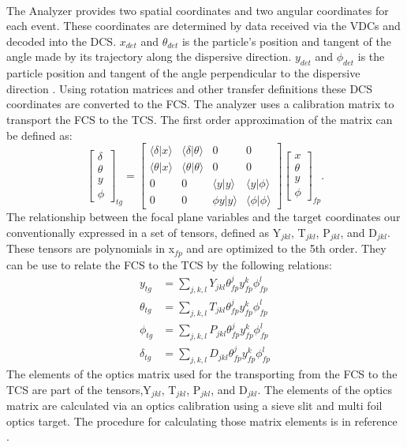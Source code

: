 \paragraph{} The Analyzer provides two spatial coordinates and two angular coordinates for each event. These coordinates are determined by data received via the VDCs and decoded into the DCS. $x_{det}$ and $\theta_{det}$ is the particle's position and tangent of the angle made by its trajectory along the dispersive direction. $y_{det}$ and $\phi_{det}$ is the particle position and tangent of the angle perpendicular to the dispersive direction \cite{optics}. Using rotation matrices and other transfer definitions these DCS coordinates are converted to the FCS. The analyzer uses a calibration matrix to transport the FCS to the TCS. The first order approximation of the matrix can be defined as:
\begin{equation}
\begin{bmatrix}
	\delta \\
	\theta \\
	y      \\
	\phi   
\end{bmatrix}_{tg}
=
\begin{bmatrix}
	\langle \delta \vert x \rangle &\langle \delta \vert \theta \rangle & 0 & 0\\
	\langle \theta \vert x \rangle &\langle \theta \vert \theta \rangle & 0 & 0\\
	0 & 0 & \langle y \vert y \rangle &\langle y \vert \phi \rangle\\
	0 & 0 & \phi y \vert y \rangle &\langle \phi \vert \phi \rangle
\end{bmatrix}
\begin{bmatrix}
	x     \\    
	\theta \\
	y      \\
	\phi   
\end{bmatrix}_{fp}.
\end{equation}
The relationship between the focal plane variables and the target coordinates our conventionally expressed in a set of tensors, defined as Y$_{jkl}$, T$_{jkl}$, P$_{jkl}$, and D$_{jkl}$. These tensors are polynomials in x$_{fp}$ and are optimized to the 5th order. They can be use to relate the FCS to the TCS by the following relations:
\begin{align}
y_{tg} &= \sum_{j,k,l} Y_{jkl}\theta^j_{fp}y^k_{fp}\phi^l_{fp} \\
\theta_{tg} &= \sum_{j,k,l} T_{jkl}\theta^j_{fp}y^k_{fp}\phi^l_{fp} \\
\phi_{tg} &= \sum_{j,k,l} P_{jkl}\theta^j_{fp}y^k_{fp}\phi^l_{fp}  \\
\delta_{tg} &= \sum_{j,k,l} D_{jkl}\theta^j_{fp}y^k_{fp}\phi^l_{fp} 
\end{align}
The elements of the optics matrix used for the transporting from the FCS to the TCS are part of the tensors,Y$_{jkl}$, T$_{jkl}$, P$_{jkl}$, and D$_{jkl}$. The elements of the optics matrix are calculated via an optics calibration using a sieve slit and multi foil optics target. The procedure for calculating those matrix elements is in reference \cite{optics}. 
